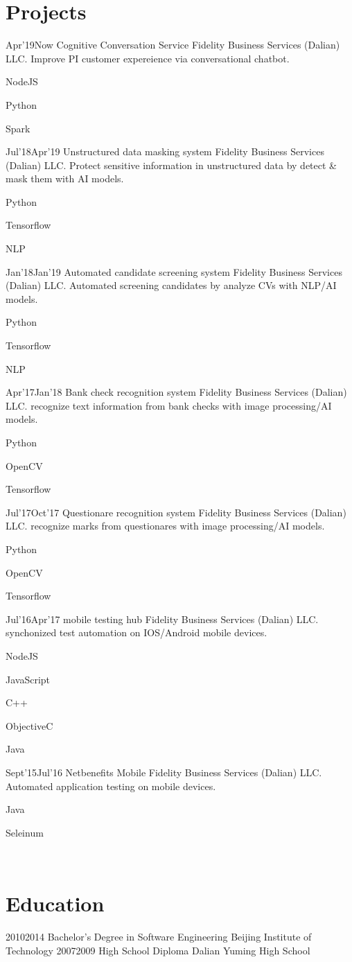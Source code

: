 \documentclass[]{lubricy-cv}
\begin{document}
\section{Projects}
\begin{entrylist}
  \entry
    {Apr'19}{Now}
    {Cognitive Conversation Service}
    {Fidelity Business Services (Dalian) LLC.}
    {Improve PI customer expereience via conversational chatbot.}
    {
      \item NodeJS
      \item Python
      \item Spark }
  \entry
    {Jul'18}{Apr'19}
    {Unstructured data masking system}
    {Fidelity Business Services (Dalian) LLC.}
    {Protect sensitive information in unstructured data by detect \& mask them with AI models.}
    {
      \item Python
      \item Tensorflow
      \item NLP }
  \entry
    {Jan'18}{Jan'19}
    {Automated candidate screening system}
    {Fidelity Business Services (Dalian) LLC.}
    {Automated screening candidates by analyze CVs with NLP/AI models.}
    {
      \item Python
      \item Tensorflow
      \item NLP}
  \entry
    {Apr'17}{Jan'18}
    {Bank check recognition system}
    {Fidelity Business Services (Dalian) LLC.}
    {recognize text information from bank checks with image processing/AI models.}
    {
      \item Python
      \item OpenCV
      \item Tensorflow}
  \entry
    {Jul'17}{Oct'17}
    {Questionare recognition system}
    {Fidelity Business Services (Dalian) LLC.}
    {recognize marks from questionares with image processing/AI models.}
    {
      \item Python
      \item OpenCV
      \item Tensorflow}
  \entry
    {Jul'16}{Apr'17}
    {mobile testing hub}
    {Fidelity Business Services (Dalian) LLC.}
    {synchonized test automation on IOS/Android mobile devices.}
    {
      \item NodeJS
      \item JavaScript
      \item C++
      \item ObjectiveC
      \item Java}
  \entry
    {Sept'15}{Jul'16}
    {Netbenefits Mobile}
    {Fidelity Business Services (Dalian) LLC.}
    {Automated application testing on mobile devices.}
    {
      \item Java
      \item Seleinum}
\end{entrylist}
~
\section{Education}
\begin{entrylist}
  \entry
    {2010}{2014}
    {Bachelor's Degree in Software Engineering}
    {Beijing Institute of Technology}
    {} {}
  \entry
    {2007}{2009}
    {High School Diploma}
    {Dalian Yuming High School}
    {} {}
\end{entrylist}
\end{document}
